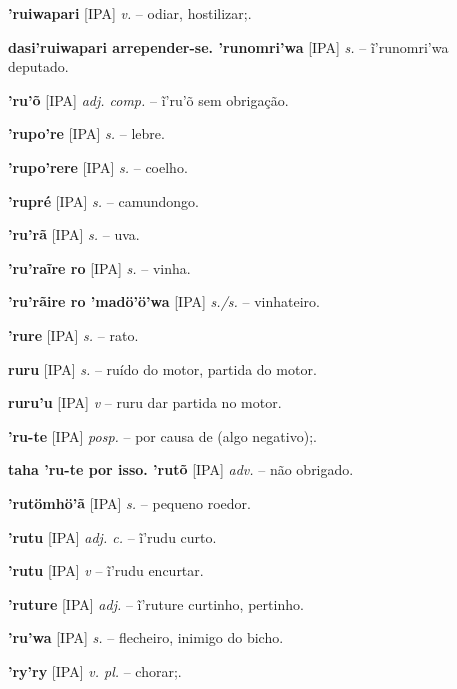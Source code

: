 \textbf{'ruiwapari} [IPA] \textit{v.} -- odiar, hostilizar;.

\textbf{dasi'ruiwapari arrepender-se. 'runomri'wa} [IPA] \textit{s.} -- ĩ'runomri'wa deputado.

\textbf{'ru'õ} [IPA] \textit{adj. comp.} -- ĩ'ru'õ sem obrigação.

\textbf{'rupo're} [IPA] \textit{s.} -- lebre.

\textbf{'rupo'rere} [IPA] \textit{s.} -- coelho.

\textbf{'rupré} [IPA] \textit{s.} -- camundongo.

\textbf{'ru'rã} [IPA] \textit{s.} -- uva.

\textbf{'ru'raĩre ro} [IPA] \textit{s.} -- vinha.

\textbf{'ru'rãire ro 'madö'ö'wa} [IPA] \textit{s./s.} -- vinhateiro.

\textbf{'rure} [IPA] \textit{s.} -- rato.

\textbf{ruru} [IPA] \textit{s.} -- ruído do motor, partida do motor.

\textbf{ruru'u} [IPA] \textit{v} -- ruru dar partida no motor.

\textbf{'ru-te} [IPA] \textit{posp.} -- por causa de (algo negativo);.

\textbf{taha 'ru-te por isso. 'rutõ} [IPA] \textit{adv.} -- não obrigado.

\textbf{'rutömhö'ã} [IPA] \textit{s.} -- pequeno roedor.

\textbf{'rutu} [IPA] \textit{adj. c.} -- ĩ'rudu curto.

\textbf{'rutu} [IPA] \textit{v} -- ĩ'rudu encurtar.

\textbf{'ruture} [IPA] \textit{adj.} -- ĩ'ruture curtinho, pertinho.

\textbf{'ru'wa} [IPA] \textit{s.} -- flecheiro, inimigo do bicho.

\textbf{'ry'ry} [IPA] \textit{v. pl.} -- chorar;.

